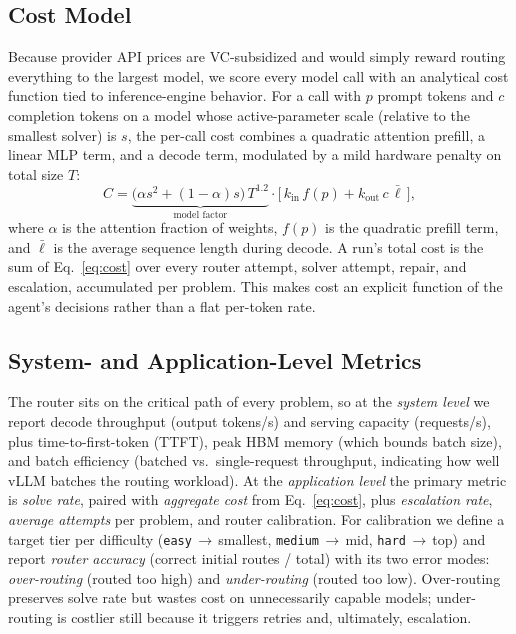 \documentclass[10pt]{article}
\begin{document}
\subsection{Cost Model}
\label{sec:costmodel}
Because provider API prices are VC-subsidized and would simply reward routing
everything to the largest model, we score every model call with an analytical cost
function tied to inference-engine behavior. For a call with $p$ prompt tokens and $c$
completion tokens on a model whose active-parameter scale (relative to the smallest
solver) is $s$, the per-call cost combines a quadratic attention prefill, a linear MLP
term, and a decode term, modulated by a mild hardware penalty on total size $T$:
\begin{equation}
\label{eq:cost}
C = \underbrace{\big(\alpha s^2 + (1-\alpha)s\big)\,T^{1.2}}_{\text{model factor}}
    \cdot \big[\, k_{\text{in}}\,f(p) + k_{\text{out}}\,c\,\bar{\ell} \,\big],
\end{equation}
where $\alpha$ is the attention fraction of weights, $f(p)$ is the quadratic prefill
term, and $\bar{\ell}$ is the average sequence length during decode. A run's total
cost is the sum of Eq.~\eqref{eq:cost} over every router attempt, solver attempt,
repair, and escalation, accumulated per problem. This makes cost an explicit function
of the agent's decisions rather than a flat per-token rate.

\subsection{System- and Application-Level Metrics}
\label{sec:metrics}
The router sits on the critical path of every problem, so at the \emph{system level} we
report decode throughput (output tokens/s) and serving capacity (requests/s), plus
time-to-first-token (TTFT), peak HBM memory (which bounds batch size), and batch
efficiency (batched vs.\ single-request throughput, indicating how well vLLM batches
the routing workload). At the \emph{application level} the primary metric is
\emph{solve rate}, paired with \emph{aggregate cost} from Eq.~\eqref{eq:cost}, plus
\emph{escalation rate}, \emph{average attempts} per problem, and router calibration. For
calibration we define a target tier per difficulty
(\texttt{easy}\,$\rightarrow$\,smallest, \texttt{medium}\,$\rightarrow$\,mid,
\texttt{hard}\,$\rightarrow$\,top) and report \emph{router accuracy} (correct initial
routes / total) with its two error modes: \emph{over-routing} (routed too high) and
\emph{under-routing} (routed too low). Over-routing preserves solve rate but wastes cost
on unnecessarily
capable models; under-routing is costlier still because it triggers retries and,
ultimately, escalation.
\end{document}
